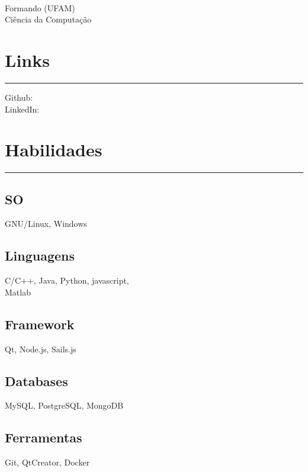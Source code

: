 \documentclass[]{rahulworld-resume}
\begin{document}
%
%

\begin{minipage}[t]{0.33\textwidth} 
\begin{large}
	\\
\end{large}
Formando (UFAM)\\
Ciência da Computação\\ 
\section{Links} 
\noindent\rule{5cm}{0.4pt}

Github: {} \\
LinkedIn: {} \\
\section{Habilidades}
\noindent\rule{5cm}{0.4pt}
\subsection{SO}
GNU/Linux, Windows
\vspace{6pt}
\subsection{Linguagens}
C/C++, Java, Python, javascript,\\
Matlab
\vspace{6pt}
\subsection{Framework}
Qt, Node.js, Sails.js
\vspace{6pt}
\subsection{Databases}
MySQL, PostgreSQL, MongoDB
\vspace{6pt}
\subsection{Ferramentas}
Git, QtCreator, Docker
\vspace{6pt}

\end{minipage}
\end{document}
